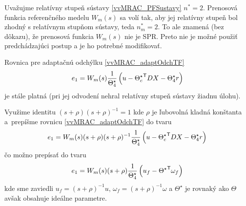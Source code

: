 \documentclass[a4paper, 10pt, ]{article}
\begin{document}
Uvažujme relatívny stupeň sústavy \eqref{vvMRAC_PFSustavy} $n^* = 2$. Prenosová funkcia referenčného medelu $W_m(s)$ sa volí tak, aby jej relatívny stupeň bol zhodný s relatívnym stupňom sústavy, teda $n_m^* = 2$. To ale znamená (bez dôkazu), že prenosová funkcia $W_m(s)$ nie je SPR. Preto nie je možné použiť predchádzajúci postup a je ho potrebné modifikovať.

Rovnica pre adaptačnú odchýlku \eqref{vvMRAC_adaptOdchTF}
\begin{equation} \label{vvMRAC_adaptOdchTFn2}
	e_1 = W_m(s)  \frac{1}{\Theta_4^\star} \left( u - {\Theta_c^\star}^{\mathsf{T}} D  X - \Theta_4^\star  r \right)
\end{equation}
je stále platná (pri jej odvodení nehral relatívny stupeň sústavy žiadnu úlohu).

Využime identitu $(s+\rho)(s+\rho)^{-1} = 1$ kde $\rho$ je ľubovolná kladná konštanta a~prepíšme rovnicu \eqref{vvMRAC_adaptOdchTF} do tvaru
\begin{equation}  \label{vvMRAC_adaptOdchI}
	e_1 = W_m(s) (s+\rho)(s+\rho)^{-1} \frac{1}{\Theta_4^\star} \left( u - {\Theta_c^\star}^{\mathsf{T}} D X - \Theta_4^\star  r \right)
\end{equation}
čo možno prepísať do tvaru
\begin{equation}  \label{vvMRAC_adaptOdchI_02}
	e_1 = W_m(s) (s+\rho) \frac{1}{\Theta_4^\star} \left( u_f - {\Theta^\star}^{\mathsf{T}} \omega_f \right)
\end{equation}
kde sme zaviedli $u_f = (s+\rho)^{-1} u$, $\omega_f = (s+\rho)^{-1} \omega$ a ${\Theta^\star}$ je rovnaký ako $\Theta$ avšak obsahuje ideálne parametre.
\end{document}
